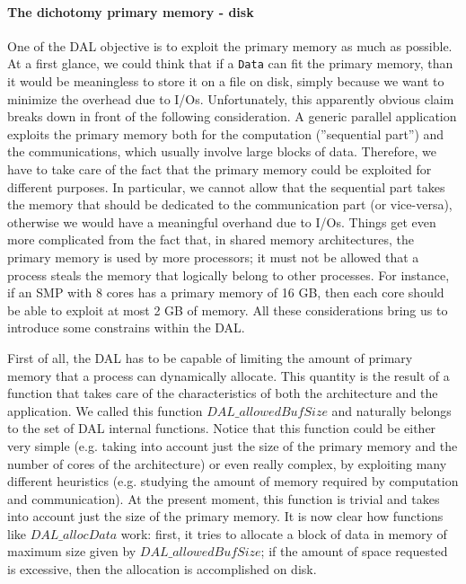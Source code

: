 \paragraph{The dichotomy primary memory - disk}
One of the DAL objective is to exploit the primary memory as much as possible. At a first glance, we could think that if a \texttt{Data} can fit the primary memory, than it would be meaningless to store it on a file on disk, simply because we want to minimize the overhead due to I/Os. Unfortunately, this apparently obvious claim breaks down in front of the following consideration. A generic parallel application exploits the primary memory both for the computation (''sequential part'') and the communications, which usually involve large blocks of data. Therefore, we have to take care of the fact that the primary memory could be exploited for different purposes. In particular, we cannot allow that the sequential part takes the memory that should be dedicated to the communication part (or vice-versa), otherwise we would have a meaningful overhand due to I/Os. Things get even more complicated from the fact that, in shared memory architectures, the primary memory is used by more processors; it must not be allowed that a process steals the memory that logically belong to other processes. For instance, if an SMP with 8 cores has a primary memory of 16 GB, then each core should be able to exploit at most 2 GB of memory. All these considerations bring us to introduce some constrains within the DAL. 

First of all, the DAL has to be capable of limiting the amount of primary memory that a process can dynamically allocate. This quantity is the result of a function that takes care of the characteristics of both the architecture and the application. We called this function $DAL\_allowedBufSize$ and naturally belongs to the set of DAL internal functions. Notice that this function could be either very simple (e.g. taking into account just the size of the primary memory and the number of cores of the architecture) or even really complex, by exploiting many different heuristics (e.g. studying the amount of memory required by computation and communication). At the present moment, this function is trivial and takes into account just the size of the primary memory. It is now clear how functions like $DAL\_allocData$ work: first, it tries to allocate a block of data in memory of maximum size given by $DAL\_allowedBufSize$; if the amount of space requested is excessive, then the allocation is accomplished on disk. 


